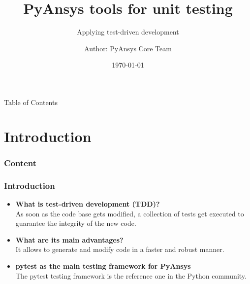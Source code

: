 \documentclass[t]{beamer}
\begin{document}

\title{PyAnsys tools for unit testing}
\subtitle{Applying test-driven development}
\author{Author: PyAnsys Core Team}
\date{\today}

\titleframe{}



\begin{frame}{Table of Contents}
  \tableofcontents
  \vspace{200pt}  %
\end{frame}


\section{Introduction}
\begin{frame}
  \frametitle{Content}
  \tableofcontents[currentsection]
  \vspace{200pt}  %
\end{frame}

\begin{frame}[fragile=singleslide]
  \frametitle{Introduction}

  \begin{itemize}
  \setlength\itemsep{1em}

  \item{\textbf{What is test-driven development (TDD)?}
    \\As soon as the code base gets modified, a collection of tests get executed
    to guarantee the integrity of the new code.
  }

  \item{\textbf{What are its main advantages?}
    \\It allows to generate and modify code in a faster and robust manner.
    }

        
  \item {\textbf{pytest as the main testing framework for PyAnsys}
    \\The pytest testing framework is the reference one in the Python community.
    }

  \end{itemize}

\end{frame}
\end{document}
